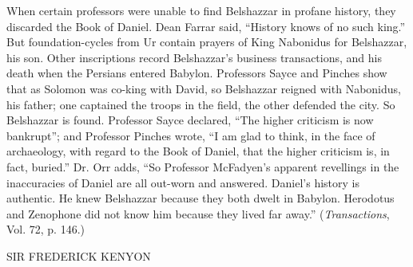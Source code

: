When certain professors were unable to find Belshazzar in profane history, they discarded the
Book of Daniel. Dean Farrar said, ``History knows of no such king.'' But foundation-cycles
from Ur contain prayers of King Nabonidus for Belshazzar, his son. Other inscriptions record
Belshazzar's business transactions, and his death when the Persians entered Babylon.
Professors Sayce and Pinches show that as Solomon was co-king with David, so Belshazzar
reigned with Nabonidus, his father; one captained the troops in the field, the other defended
the city. So Belshazzar is found. Professor Sayce declared, ``The higher criticism is now
bankrupt''; and Professor Pinches wrote, ``I am glad to think, in the face of archaeology, with
regard to the Book of Daniel, that the higher criticism is, in fact, buried.'' Dr. Orr adds, ``So
Professor McFadyen's apparent revellings in the inaccuracies of Daniel are all out-worn and
answered. Daniel's history is authentic. He knew Belshazzar because they both dwelt in
Babylon. Herodotus and Zenophone did not know him because they lived far away.''
(\textit{Transactions}, Vol. 72, p. 146.)

SIR FREDERICK KENYON


